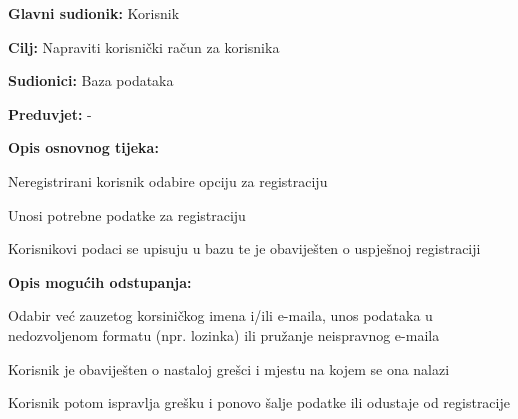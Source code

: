 						\noindent {}
					\begin{packed_item}
						
						\item \textbf{Glavni sudionik: }Korisnik
						\item  \textbf{Cilj:} Napraviti korisnički račun za korisnika
						\item  \textbf{Sudionici:} Baza podataka
						\item  \textbf{Preduvjet:} -
						\item  \textbf{Opis osnovnog tijeka:}
						
						\item[] \begin{packed_enum}
							
							\item Neregistrirani korisnik odabire opciju za registraciju
							\item Unosi potrebne podatke za registraciju
							\item Korisnikovi podaci se upisuju u bazu te je obaviješten o uspješnoj registraciji
						\end{packed_enum}
						
						\item  \textbf{Opis mogućih odstupanja:}
						
						\item[] \begin{packed_item}
							
							\item[2.a] Odabir već zauzetog korsiničkog imena i/ili e-maila, unos podataka u nedozvoljenom formatu (npr. lozinka) ili pružanje neispravnog e-maila
							\item[] \begin{packed_enum}
								
								\item Korisnik je obaviješten o nastaloj grešci i mjestu na kojem se ona nalazi
								\item Korisnik potom ispravlja grešku i ponovo šalje podatke ili odustaje od registracije
								
							\end{packed_enum}					
						\end{packed_item}
					\end{packed_item}
				
